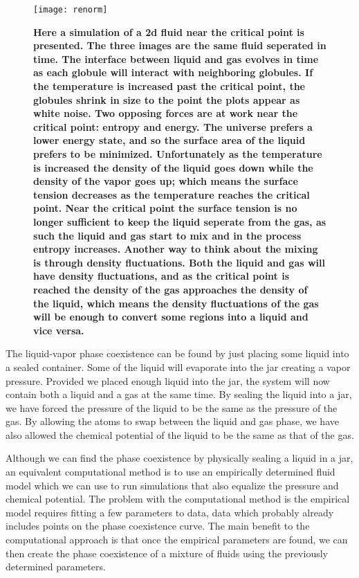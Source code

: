\begin{figure}[h]
\vspace*{-5mm}
\hspace*{-6mm}
	\centering
	\texttt{[image: renorm]}
	\caption{
	\scriptsize
	\textbf{Here a simulation of a 2d fluid near the critical point is presented. The three images are the same fluid seperated in time. The interface between liquid and gas evolves in time as each globule will interact with neighboring globules. If the temperature is increased past the critical point, the globules shrink in size to the point the plots appear as white noise. Two opposing forces are at work near the critical point: entropy and energy. The universe prefers a lower energy state, and so the surface area of the liquid prefers to be minimized. Unfortunately as the temperature is increased the density of the liquid goes down while the density of the vapor goes up; which means the surface tension decreases as the temperature reaches the critical point. Near the critical point the surface tension is no longer sufficient to keep the liquid seperate from the gas, as such the liquid and gas start to mix and in the process entropy increases. 
Another way to think about the mixing is through density fluctuations. Both the liquid and gas will have density fluctuations, and as the critical point is reached the density of the gas approaches the density of the liquid, which means the density fluctuations of the gas will be enough to convert some regions into a liquid and vice versa.}}
	\label{fig:renorm}
\end{figure}

The liquid-vapor phase coexistence can be found by just placing some liquid into a sealed container. Some of the liquid will evaporate into the jar creating a vapor pressure. Provided we placed enough liquid into the jar, the system will now contain both a liquid and a gas at the same time. By sealing the liquid into a jar, we have forced the pressure of the liquid to be the same as the pressure of the gas. By allowing the atoms to swap between the liquid and gas phase, we have also allowed the chemical potential of the liquid to be the same as that of the gas.

Although we can find the phase coexistence by physically sealing a liquid in a jar, an equivalent computational method is to use an empirically determined fluid model which we can use to run simulations that also equalize the pressure and chemical potential. The problem with the computational method is the empirical model requires fitting a few parameters to data, data which probably already includes points on the phase coexistence curve. The main benefit to the computational approach is that once the empirical parameters are found, we can then create the phase coexistence of a mixture of fluids using the previously determined parameters.

